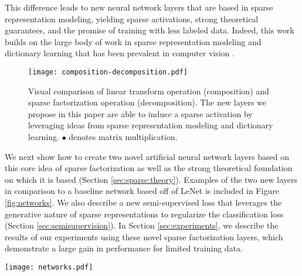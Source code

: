 \documentclass[10pt,twocolumn,letterpaper]{article}
\begin{document}
This difference leads to new neural network layers that are based in sparse representation modeling, yielding sparse activations, strong theoretical guarantees, and the promise of training with less labeled data. 
Indeed, this work builds on the large body of work in sparse representation modeling and dictionary learning that has been prevalent in computer vision 
 \cite{YuLiLaCVPR2011,zhang2010discriminative,mairal2008sparse,luo2013group}.


\begin{figure}[t]
    \centering
    \texttt{[image: composition-decomposition.pdf]}
    \caption{Visual comparison of linear transform operation (composition) and sparse factorization operation (decomposition).  The new layers we propose in this paper are able to induce a sparse activation by leveraging ideas from sparse representation modeling and dictionary learning. $\bullet$ denotes matrix multiplication.}
\label{fig:visual_ltvsf}
\end{figure}

We next show how to create two novel artificial neural network layers based on this core idea of sparse factorization as well as the strong theoretical foundation on which it is based (Section \ref{sec:sparse:theory}).  Examples of the two new layers in comparison to a baseline network based off of LeNet \cite{LeBoBeIEEE1998} is included in Figure \ref{fig:networks}.  We also describe a new semi-supervised loss that leverages the generative nature of sparse representations to regularize the classification loss (Section \ref{sec:semisupervision}). 
In Section \ref{sec:experiments}, we describe the results of our experiments using these novel sparse factorization layers, which demonstrate a large gain in performance for limited training data.


\begin{figure*}
    \centering
    \texttt{[image: networks.pdf]}
    \caption{Illustrative comparison of the role our two new sparse factorization layers can provide in a classical network architecture (left) suitable for a digit classification problem like MNIST.  The three networks show the data layer at the bottom and the final activation at the top; computations are drawn in black and activation tensors are drawn in blue. The sparse factorization layer replaces both the fully connected layer and the subsequent rectified linear unit layer (since this would conflict with the possible negative weights of the sparse activation), which is why the SF network has only 6 layers.  The convolutional sparse factorization network replaces the first convolution layer with the CSF layer.  All other things are equal and comparable.   }
    \label{fig:networks}
\end{figure*}
\end{document}
